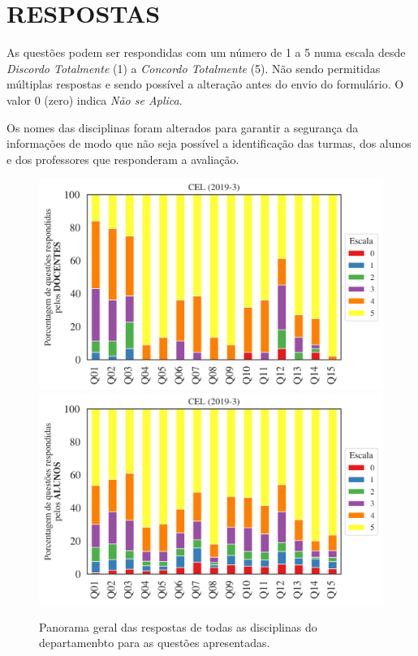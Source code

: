\documentclass[a4paper,10pt]{article}
\begin{document}
\section{RESPOSTAS}
As questões podem ser respondidas com um número de 1 a 5 numa escala desde {\it Discordo Totalmente} (1) a {\it Concordo Totalmente} (5). Não sendo permitidas múltiplas respostas e sendo possível a alteração antes do envio do formulário. O valor 0 (zero) indica {\it Não se Aplica}.

Os nomes das disciplinas foram alterados para garantir a segurança da informações de modo que não seja possível a identificação das turmas, dos alunos  e dos professores que responderam a avaliação.

\begin{figure}[h]
\centering
\includegraphics[width=0.85\linewidth]{analise_geral_departamento_CEL_docentes.png}
\includegraphics[width=0.85\linewidth]{analise_geral_departamento_CEL_alunos.png}
\caption{\label{fig:analise_geral_departamento}            Panorama geral das respostas de todas as  disciplinas do departamenbto para as questões apresentadas.}
\end{figure}
\end{document}
